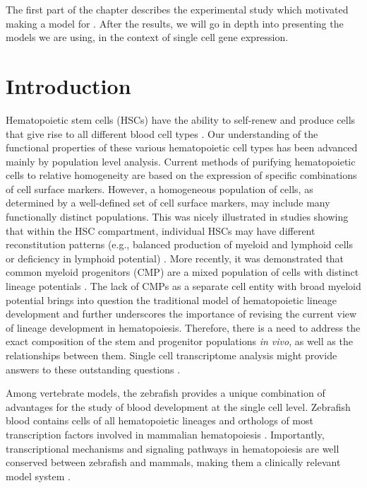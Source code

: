The first part of the chapter describes the experimental study which motivated making a model for . After the results, we will go in depth into presenting the models we are using, in the context of single cell gene expression.

\section{Introduction}

Hematopoietic stem cells (HSCs) have the ability to self-renew and produce cells that give rise to all different blood cell types \cite{Orkin2008-os}. Our understanding of the functional properties of these various hematopoietic cell types has been advanced mainly by population level analysis. Current methods of purifying hematopoietic cells to relative homogeneity are based on the expression of specific combinations of cell surface markers. However, a homogeneous population of cells, as determined by a well-defined set of cell surface markers, may include many functionally distinct populations. This was nicely illustrated in studies showing that within the HSC compartment, individual HSCs may have different reconstitution patterns (e.g., balanced production of myeloid and lymphoid cells or deficiency in lymphoid potential) \cite{Muller-Sieburg2012-vb}. More recently, it was demonstrated that common myeloid progenitors (CMP) are a mixed population of cells with distinct lineage potentials \cite{Notta2015-ng}. The lack of CMPs as a separate cell entity with broad myeloid potential brings into question the traditional model of hematopoietic lineage development and further underscores the importance of revising the current view of lineage development in hematopoiesis. Therefore, there is a need to address the exact composition of the stem and progenitor populations \textit{in vivo}, as well as the relationships between them. Single cell transcriptome analysis might provide answers to these outstanding questions \cite{Cvejic2015-ra}.

Among vertebrate models, the zebrafish provides a unique combination of advantages for the study of blood development at the single cell level. Zebrafish blood contains cells of all hematopoietic lineages and orthologs of most transcription factors involved in mammalian hematopoiesis \cite{Hsia2005-fg, Song2004-jn}. Importantly, transcriptional mechanisms and signaling pathways in hematopoiesis are well conserved between zebrafish and mammals, making them a clinically relevant model system \cite{Jagannathan-Bogdan2013-du}.

